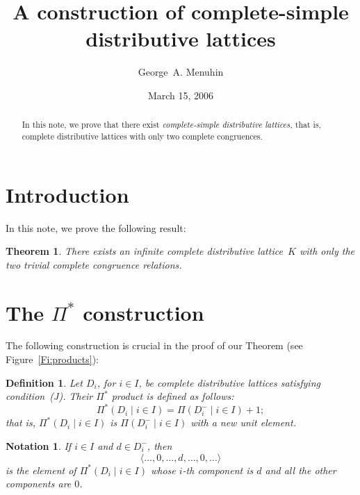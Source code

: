 \documentclass{amsart}
\newtheorem{theorem}{Theorem}
\newtheorem{definition}{Definition}
\newtheorem{notation}{Notation}
\begin{document}
\title{A construction of complete-simple\\  
       distributive lattices}
\author{George~A. Menuhin}
\address{Computer Science Department\\
         University of Winnebago\\
         Winnebago, MN 53714} 
\date{March 15, 2006}

\begin{abstract}
   In this note, we prove that there exist 
   \emph{complete-simple distributive lattices,} 
   that is, complete distributive lattices
  with only two complete congruences. 
\end{abstract}

\maketitle

\section{Introduction}\label{S:intro} 
In this note, we prove the following result:

\begin{theorem} 
There exists an infinite complete distributive 
lattice~$K$ with only the two trivial complete 
congruence relations.
\end{theorem}

\section{The $\Pi^{*}$ construction}\label{S:P*} 
The following construction is crucial in the proof
of our Theorem (see Figure~\ref{Fi:products}):

\begin{definition}\label{D:P*} 
Let $D_{i}$, for $i \in I$, be complete distributive 
lattices satisfying condition~\textup{(J)}.  Their 
$\Pi^{*}$ product is defined as follows:
\[
   \Pi^{*} ( D_{i} \mid i \in I ) = 
   \Pi ( D_{i}^{-} \mid i \in I ) + 1;
\]
that is, $\Pi^{*} ( D_{i} \mid i \in I )$ is 
$\Pi ( D_{i}^{-} \mid i \in I )$ with a new 
unit element. 
\end{definition}

\begin{notation}
If $i \in I$ and $d \in D_{i}^{-}$, then
\[
  \langle \dots, 0, \dots, d, \dots, 0, \dots \rangle
\]
is the element of $\Pi^{*} ( D_{i} \mid i \in I )$ whose 
$i$-th component is $d$ and all the other components 
are $0$.
\end{notation}
\end{document}
